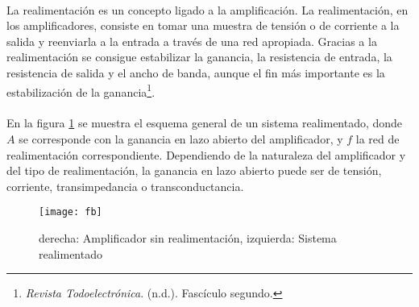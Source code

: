 \paragraph{}
La realimentación es un concepto ligado a la amplificación.
La realimentación, en los amplificadores, consiste en tomar una muestra de tensión o de corriente a la salida y reenviarla a la entrada a través de una red apropiada.
Gracias a la realimentación se consigue estabilizar la ganancia, la resistencia de entrada, la resistencia de salida y el ancho de banda, aunque el fin más importante es la estabilización de la ganancia\footnote{\textit{Revista Todoelectrónica}. (n.d.). Fascículo segundo.}.
\paragraph{}
En la figura \ref{fig:fb} se muestra el esquema general de un sistema realimentado, donde $A$ se corresponde con la ganancia en lazo abierto del amplificador, y $f$ la red de realimentaci\'on correspondiente. Dependiendo de la naturaleza del amplificador y del tipo de realimentación, la ganancia en lazo abierto puede ser de tensión, corriente, transimpedancia o transconductancia.
\begin{figure}[h]
    \centering
    \texttt{[image: fb]}
    \caption{derecha: Amplificador sin realimentaci\'on, izquierda: Sistema realimentado} 
    \label{fig:fb}
\end{figure}
